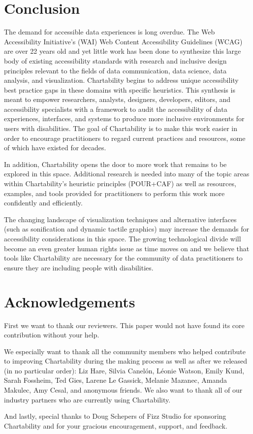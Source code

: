 \documentclass{egpubl}
\begin{document}
\section{Conclusion}

The demand for accessible data experiences is long overdue. The Web Accessibility Initiative’s (WAI) Web Content Accessibility Guidelines (WCAG) are over 22 years old and yet little work has been done to synthesize this large body of existing accessibility standards with research and inclusive design principles relevant to the fields of data communication, data science, data analysis, and visualization. Chartability begins to address unique accessibility best practice gaps in these domains with specific heuristics. This synthesis is meant to empower researchers, analysts, designers, developers, editors, and accessibility specialists with a framework to audit the accessibility of data experiences, interfaces, and systems to produce more inclusive environments for users with disabilities. The goal of Chartability is to make this work easier in order to encourage practitioners to regard current practices and resources, some of which have existed for decades. 

In addition, Chartability opens the door to more work that remains to be explored in this space. Additional research is needed into many of the topic areas within Chartability’s heuristic principles (POUR+CAF) as well as resources, examples, and tools provided for practitioners to perform this work more confidently and efficiently. 

The changing landscape of visualization techniques and alternative interfaces (such as sonification and dynamic tactile graphics) may increase the demands for accessibility considerations in this space. The growing technological divide will become an even greater human rights issue as time moves on and we believe that tools like Chartability are necessary for the community of data practitioners to ensure they are including people with disabilities.

\section*{Acknowledgements}
First we want to thank our reviewers. This paper would not have found its core contribution without your help. 

We especially want to thank all the community members who helped contribute to improving Chartability during the making process as well as after we released (in no particular order): Liz Hare, Silvia Canelón, Léonie Watson, Emily Kund, Sarah Fossheim, Ted Gies, Larene Le Gassick, Melanie Mazanec, Amanda Makulec, Amy Cesal, and anonymous friends. We also want to thank all of our industry partners who are currently using Chartability.

And lastly, special thanks to Doug Schepers of Fizz Studio for sponsoring Chartability and for your gracious encouragement, support, and feedback. 


  
        

\end{document}
